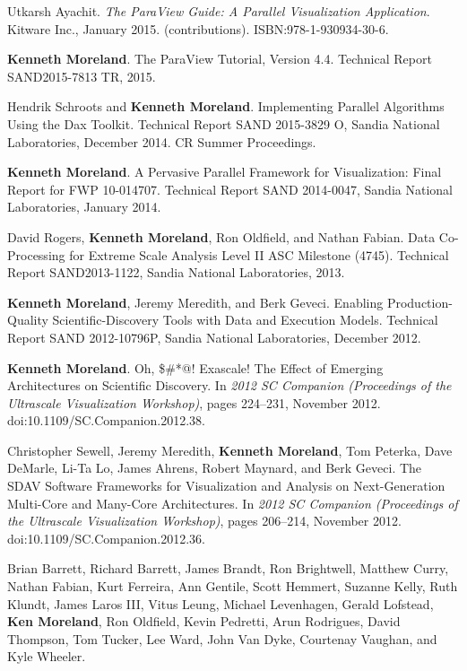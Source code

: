 \begin{enumerate}[label={[\arabic*]}, left=0pt]
\item  %
  Utkarsh Ayachit.
  \emph{The {ParaView} Guide: A Parallel Visualization Application}.
Kitware Inc., January 2015.
(contributions).  ISBN:978-1-930934-30-6.
\item  %
  \textbf{Kenneth Moreland}.
  The {ParaView} Tutorial, Version 4.4.
Technical Report SAND2015-7813 TR, 2015.
\item  %
  Hendrik Schroots and \textbf{Kenneth Moreland}.
  Implementing Parallel Algorithms Using the Dax Toolkit.
Technical Report SAND 2015-3829 O, Sandia National Laboratories, December 2014.
CR Summer Proceedings.\item  %
  \textbf{Kenneth Moreland}.
  A Pervasive Parallel Framework for Visualization: Final Report for FWP 10-014707.
Technical Report SAND 2014-0047, Sandia National Laboratories, January 2014.
\item  %
  David Rogers, \textbf{Kenneth Moreland}, Ron Oldfield, and Nathan Fabian.
  Data Co-Processing for Extreme Scale Analysis Level {II} {ASC} Milestone (4745).
Technical Report SAND2013-1122, Sandia National Laboratories, 2013.
\item  %
  \textbf{Kenneth Moreland}, Jeremy Meredith, and Berk Geveci.
  Enabling Production-Quality Scientific-Discovery Tools with Data and Execution Models.
Technical Report SAND 2012-10796P, Sandia National Laboratories, December 2012.
\item  %
  \textbf{Kenneth Moreland}.
  {Oh, \$\#*@! Exascale!} {The} Effect of Emerging Architectures on Scientific Discovery.
  In \emph{2012 SC Companion (Proceedings of the Ultrascale Visualization Workshop)}, pages 224--231, November 2012.
  doi:10.1109/SC.Companion.2012.38.
\item  %
  Christopher Sewell, Jeremy Meredith, \textbf{Kenneth Moreland}, Tom Peterka, Dave DeMarle, Li-Ta Lo, James Ahrens, Robert Maynard, and Berk Geveci.
  The {SDAV} Software Frameworks for Visualization and Analysis on Next-Generation Multi-Core and Many-Core Architectures.
  In \emph{2012 SC Companion (Proceedings of the Ultrascale Visualization Workshop)}, pages 206--214, November 2012.
  doi:10.1109/SC.Companion.2012.36.
\item  %
  Brian Barrett, Richard Barrett, James Brandt, Ron Brightwell, Matthew Curry, Nathan Fabian, Kurt Ferreira, Ann Gentile, Scott Hemmert, Suzanne Kelly, Ruth Klundt, James Laros III, Vitus Leung, Michael Levenhagen, Gerald Lofstead, \textbf{Ken Moreland}, Ron Oldfield, Kevin Pedretti, Arun Rodrigues, David Thompson, Tom Tucker, Lee Ward, John Van Dyke, Courtenay Vaughan, and Kyle Wheeler.

\end{enumerate}
